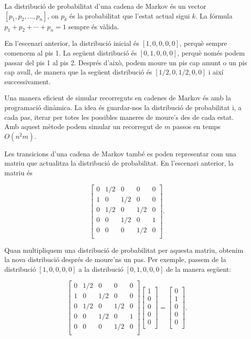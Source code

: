 La distribució de probabilitat d'una cadena de Markov és un vector
$[p_1,p_2,\ldots,p_n]$, on $p_k$ és la probabilitat que l'estat actual
sigui $k$. La fórmula $p_1+p_2+\cdots+p_n=1$ sempre és vàlida.

En l'escenari anterior, la distribució inicial és $[1,0,0,0,0]$,
perquè sempre comencem al pis 1. La següent distribució és
$[0,1,0,0,0]$, perquè només podem passar del pis 1 al pis 2. Després
d'això, podem moure un pis cap amunt o un pis cap avall, de manera que
la següent distribució és $[1/2,0,1/2,0,0]$ i així successivament.

Una manera eficient de simular recorreguts en cadenes de Markov és amb
la programació dinàmica. La idea és guardar-nos la distribució de
probabilitat i, a cada pas, iterar per totes les possibles maneres de
moure's des de cada estat. Amb aquest mètode podem simular un recorregut
de $m$ passos en temps $O(n^2 m)$.

Les transicions d'una cadena de Markov també es poden representar com
una matriu que actualitza la distribució de probabilitat. En
l'escenari anterior, la matriu és

\[ \begin{bmatrix} 0 & 1/2 & 0 & 0 & 0 \\ 1 & 0 & 1/2 & 0 & 0 \\ 0 & 1/2 & 0 & 1/2 & 0 \\ 0 & 0 & 1/2 & 0 & 1 \\ 0 & 0 & 0 & 1/2 & 0 \\ \end{bmatrix}. \]

Quan multipliquem una distribució de probabilitat per aquesta matriu,
obtenim la nova distribució després de moure'ns un pas. Per exemple,
passem de la distribució $[1,0,0,0,0]$ a la distribució $[0,1,0,0,0]$
de la manera següent:

\[   \begin{bmatrix}   0 & 1/2 & 0 & 0 & 0 \\   1 & 0 & 1/2 & 0 & 0 \\   0 & 1/2 & 0 & 1/2 & 0 \\   0 & 0 & 1/2 & 0 & 1 \\   0 & 0 & 0 & 1/2 & 0 \\  \end{bmatrix}  \begin{bmatrix}   1 \\   0 \\   0 \\   0 \\   0 \\  \end{bmatrix} =  \begin{bmatrix}   0 \\   1 \\   0 \\   0 \\   0 \\  \end{bmatrix}. \]

